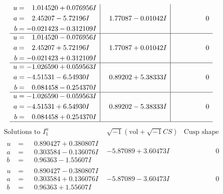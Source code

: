 \documentclass[1p]{elsarticle_modified}
\theoremstyle{definition}
\newcommand{\I}{\sqrt{-1}}
\begin{document}
$$\begin{array}{c|c|c}
\begin{aligned}
u &= \phantom{-}1.014520 + 0.076956 I \\
a &= \phantom{-}2.45207 - 5.72196 I \\
b &= -0.021423 - 0.312109 I\end{aligned}
 & \phantom{-}1.77087 - 0.01042 I & \phantom{-0.000000 } 0 \\ \hline\begin{aligned}
u &= \phantom{-}1.014520 - 0.076956 I \\
a &= \phantom{-}2.45207 + 5.72196 I \\
b &= -0.021423 + 0.312109 I\end{aligned}
 & \phantom{-}1.77087 + 0.01042 I & \phantom{-0.000000 } 0 \\ \hline\begin{aligned}
u &= -1.026590 + 0.059563 I \\
a &= -4.51531 - 6.54930 I \\
b &= \phantom{-}0.084458 - 0.254370 I\end{aligned}
 & \phantom{-}0.89202 + 5.38333 I & \phantom{-0.000000 } 0 \\ \hline\begin{aligned}
u &= -1.026590 - 0.059563 I \\
a &= -4.51531 + 6.54930 I \\
b &= \phantom{-}0.084458 + 0.254370 I\end{aligned}
 & \phantom{-}0.89202 - 5.38333 I & \phantom{-0.000000 } 0\\
 \hline 
 \end{array}$$\newpage$$\begin{array}{c|c|c}  
\text{Solutions to }I^u_{1}& \I (\text{vol} + \sqrt{-1}CS) & \text{Cusp shape}\\
 \hline 
\begin{aligned}
u &= \phantom{-}0.890427 + 0.380807 I \\
a &= \phantom{-}0.303584 - 0.136076 I \\
b &= \phantom{-}0.96363 - 1.55607 I\end{aligned}
 & -5.87089 + 3.60473 I & \phantom{-0.000000 } 0 \\ \hline\begin{aligned}
u &= \phantom{-}0.890427 - 0.380807 I \\
a &= \phantom{-}0.303584 + 0.136076 I \\
b &= \phantom{-}0.96363 + 1.55607 I\end{aligned}
 & -5.87089 - 3.60473 I & \phantom{-0.000000 } 0 \\ \hline\begin{aligned}

\end{aligned}
\end{array}$$
\end{document}
